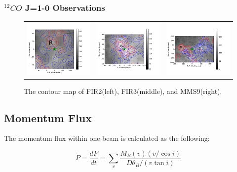 \documentclass[twoside,11pt]{gshs_thesis}
\begin{document}
\subsubsection{$^{12}CO$ J=1-0 Observations}

\begin{figure}[h!]
	\begin{tabular}{ccc}
		\includegraphics[width = 5cm]{Orion_12CO_NRO_HOPS68_rbcontour_400.png} & \includegraphics[width = 5cm]{Orion_12CO_NRO_HOPS370_rbcontour_400.png} & \includegraphics[width = 5cm]{Orion_12CO_NRO_HOPS78_rbcontour_400.png}
	\end{tabular} 
	\caption{The contour map of FIR2(left), FIR3(middle), and MMS9(right). }
\end{figure}
 

\subsection{Momentum Flux}

The momentum flux within one beam is calculated as the following:

\begin{equation}
\dot{P} = \frac{dP}{dt} = \sum_{v} {\frac{M_B (v) (v/ \cos i)}{D\theta_B / (v \tan i)}}
\end{equation}
\end{document}

